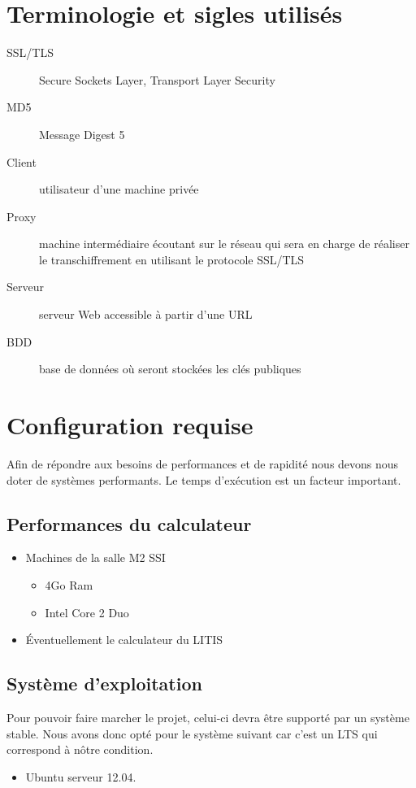 \documentclass[a4paper,11pt,french]{article}
\begin{document}
\section{Terminologie et sigles utilisés}

\begin{description}
\item[SSL/TLS] Secure Sockets Layer, Transport Layer Security 
\item[MD5] Message Digest 5
\item[Client] utilisateur d'une machine privée
\item[Proxy] machine intermédiaire écoutant sur le réseau qui sera en charge de réaliser le transchiffrement en utilisant le protocole SSL/TLS
\item[Serveur] serveur Web accessible à partir d'une URL
\item[BDD] base de données où seront stockées les clés publiques
\end{description}


\section{Configuration requise}
Afin de répondre aux besoins de performances et de rapidité nous devons nous doter de systèmes performants. Le temps d'exécution est un facteur important.



\subsection{Performances du calculateur}
\begin{itemize}
\item Machines de la salle M2 SSI
\begin{itemize}
\item 4Go Ram
\item Intel Core 2 Duo
\end{itemize}
\item \'Eventuellement le calculateur du LITIS
\end{itemize}



\subsection{Système d'exploitation}
Pour pouvoir faire marcher le projet, celui-ci devra être supporté par un système stable. Nous avons donc opté pour le système suivant car c'est un LTS qui correspond à nôtre condition.
\begin{itemize}
\item Ubuntu serveur 12.04. 
\end{itemize}
\end{document}
